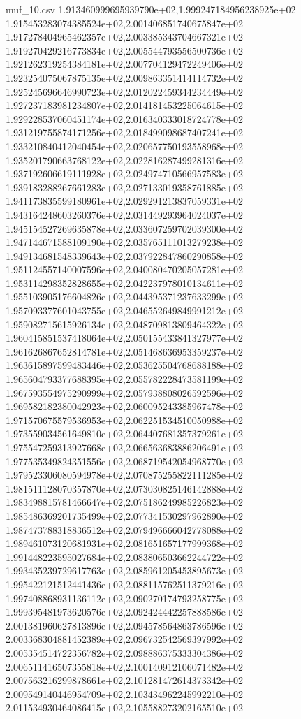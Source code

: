 \begin{filecontents*}{muf_10.csv}
1.913460999695939790e+02,1.999247184956238925e+02
1.915453283074385524e+02,2.001406851740675847e+02
1.917278404965462357e+02,2.003385343704667321e+02
1.919270429216773834e+02,2.005544793556500736e+02
1.921262319254384181e+02,2.007704129472249406e+02
1.923254075067875135e+02,2.009863351414114732e+02
1.925245696646990723e+02,2.012022459344234449e+02
1.927237183981234807e+02,2.014181453225064615e+02
1.929228537060451174e+02,2.016340333018724778e+02
1.931219755874171256e+02,2.018499098687407241e+02
1.933210840412040454e+02,2.020657750193558968e+02
1.935201790663768122e+02,2.022816287499281316e+02
1.937192606619111928e+02,2.024974710566957583e+02
1.939183288267661283e+02,2.027133019358761885e+02
1.941173835599180961e+02,2.029291213837059331e+02
1.943164248603260376e+02,2.031449293964024037e+02
1.945154527269635878e+02,2.033607259702039300e+02
1.947144671588109190e+02,2.035765111013279238e+02
1.949134681548339643e+02,2.037922847860290858e+02
1.951124557140007596e+02,2.040080470205057281e+02
1.953114298352828655e+02,2.042237978010134611e+02
1.955103905176604826e+02,2.044395371237633299e+02
1.957093377601043755e+02,2.046552649849991212e+02
1.959082715615926134e+02,2.048709813809464322e+02
1.960415851537418064e+02,2.050155433841327977e+02
1.961626867652814781e+02,2.051468636953359237e+02
1.963615897599483446e+02,2.053625504768688188e+02
1.965604793377688395e+02,2.055782228473581199e+02
1.967593554975290999e+02,2.057938808026592596e+02
1.969582182380042923e+02,2.060095243385967478e+02
1.971570675579536953e+02,2.062251534510050988e+02
1.973559034561649810e+02,2.064407681357379261e+02
1.975547259313927668e+02,2.066563683886206491e+02
1.977535349824351556e+02,2.068719542054968770e+02
1.979523306080594978e+02,2.070875255822111285e+02
1.981511128070357870e+02,2.073030825146142888e+02
1.983498815781466647e+02,2.075186249985226823e+02
1.985486369201735499e+02,2.077341530297962890e+02
1.987473788318836512e+02,2.079496666042778088e+02
1.989461073120681931e+02,2.081651657177999368e+02
1.991448223595027684e+02,2.083806503662244722e+02
1.993435239729617763e+02,2.085961205453895673e+02
1.995422121512441436e+02,2.088115762511379216e+02
1.997408868931136112e+02,2.090270174793258775e+02
1.999395481973620576e+02,2.092424442257888586e+02
2.001381960627813896e+02,2.094578564863786596e+02
2.003368304881452389e+02,2.096732542569397992e+02
2.005354514722356782e+02,2.098886375333304386e+02
2.006511416507355818e+02,2.100140912106071482e+02
2.007563216299878661e+02,2.101281472614373342e+02
2.009549140446954709e+02,2.103434962245992210e+02
2.011534930464086415e+02,2.105588273202165510e+02

\end{filecontents*}
